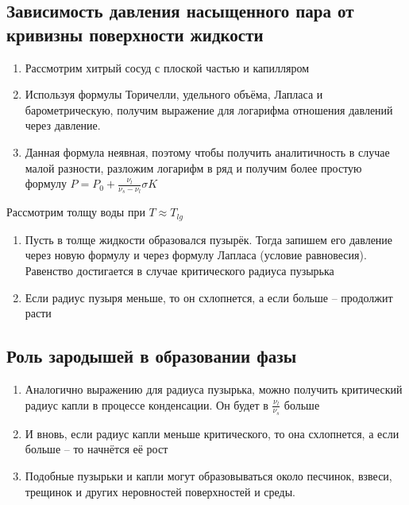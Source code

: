 \documentclass[a4paper, 14pt]{article}
\begin{document}
    \subsection{Зависимость давления насыщенного пара от кривизны поверхности жидкости}
    
    \begin{enumerate}
        \item Рассмотрим хитрый сосуд с плоской частью и капилляром
        \item Используя формулы Торичелли, удельного объёма, Лапласа и барометрическую, получим выражение для
        логарифма отношения давлений через давление.
        \item Данная формула неявная, поэтому чтобы получить аналитичность в случае малой разности, разложим логарифм
        в ряд и получим более простую формулу $P = P_0 + \frac{\nu_l}{\nu_s - \nu_l}\sigma K$
    \end{enumerate}
    
    Рассмотрим толщу воды при $T \approx T_{lg}$
    
    \begin{enumerate}
        \item Пусть в толще жидкости образовался пузырёк.
        Тогда запишем его давление через новую формулу и через формулу Лапласа (условие равновесия).
        Равенство достигается в случае критического радиуса пузырька
        \item Если радиус пузыря меньше, то он схлопнется, а если больше -- продолжит расти
    \end{enumerate}
    
    \subsection{Роль зародышей в образовании фазы}
    
    \begin{enumerate}
        \item Аналогично выражению для радиуса пузырька, можно получить критический радиус капли в процессе
        конденсации.
        Он будет в $\frac{\nu_l}{\nu_s}$ больше
        \item И вновь, если радиус капли меньше критического, то она схлопнется, а если больше -- то начнётся её рост
        \item Подобные пузырьки и капли могут образовываться около песчинок, взвеси, трещинок и других неровностей
        поверхностей и среды.
    \end{enumerate}
    
\end{document}
